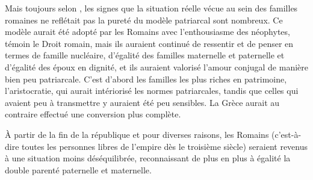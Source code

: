 Mais toujours selon , les signes que la situation réelle vécue
au sein des familles romaines ne reflétait pas la pureté du modèle patriarcal
sont nombreux. Ce modèle aurait été adopté par les Romains avec
l'enthousiasme des néophytes, témoin le Droit romain, mais ils auraient
continué de ressentir et de penser en termes de famille nucléaire,
d'égalité des familles maternelle et paternelle et d'égalité des époux en dignité,
et ils auraient valorisé l'amour conjugal de manière bien peu patriarcale.
C'est d'abord les familles les plus riches en patrimoine,
l'aristocratie, qui aurait intériorisé les normes patriarcales, tandis que celles
qui avaient peu à transmettre y auraient été peu sensibles. La Grèce
aurait au contraire effectué une conversion plus complète.

À partir de la fin de la république et pour diverses raisons, les Romains
(c'est-à-dire toutes les personnes libres de l'empire dès le troisième
siècle) seraient revenus à une situation moins déséquilibrée, reconnaissant
de plus en plus à égalité la double parenté paternelle et maternelle.

